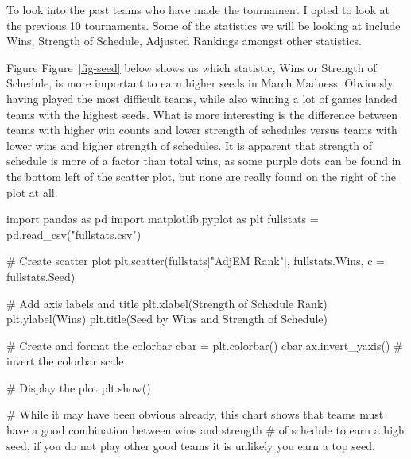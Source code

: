 \documentclass[
  letterpaper,
  DIV=11,
  numbers=noendperiod]{scrartcl}
\newenvironment{Shaded}{\begin{snugshade}}{\end{snugshade}}
\newcommand{\CommentTok}[1]{\textcolor[rgb]{0.37,0.37,0.37}{#1}}
\newcommand{\ImportTok}[1]{\textcolor[rgb]{0.00,0.46,0.62}{#1}}
\newcommand{\NormalTok}[1]{\textcolor[rgb]{0.00,0.23,0.31}{#1}}
\newcommand{\OperatorTok}[1]{\textcolor[rgb]{0.37,0.37,0.37}{#1}}
\newcommand{\StringTok}[1]{\textcolor[rgb]{0.13,0.47,0.30}{#1}}
\begin{document}
To look into the past teams who have made the tournament I opted to look
at the previous 10 tournaments. Some of the statistics we will be
looking at include Wins, Strength of Schedule, Adjusted Rankings amongst
other statistics.

Figure Figure~\ref{fig-seed} below shows us which statistic, Wins or
Strength of Schedule, is more important to earn higher seeds in March
Madness. Obviously, having played the most difficult teams, while also
winning a lot of games landed teams with the highest seeds. What is more
interesting is the difference between teams with higher win counts and
lower strength of schedules versus teams with lower wins and higher
strength of schedules. It is apparent that strength of schedule is more
of a factor than total wins, as some purple dots can be found in the
bottom left of the scatter plot, but none are really found on the right
of the plot at all.

\begin{Shaded}
\begin{Highlighting}[]
\ImportTok{import}\NormalTok{ pandas }\ImportTok{as}\NormalTok{ pd}
\ImportTok{import}\NormalTok{ matplotlib.pyplot }\ImportTok{as}\NormalTok{ plt}
\NormalTok{fullstats }\OperatorTok{=}\NormalTok{ pd.read\_csv(}\StringTok{"fullstats.csv"}\NormalTok{)}

\CommentTok{\# Create scatter plot}
\NormalTok{plt.scatter(fullstats[}\StringTok{"AdjEM Rank"}\NormalTok{], fullstats.Wins, c }\OperatorTok{=}\NormalTok{ fullstats.Seed)}

\CommentTok{\# Add axis labels and title}
\NormalTok{plt.xlabel(}\StringTok{\textquotesingle{}Strength of Schedule Rank\textquotesingle{}}\NormalTok{)}
\NormalTok{plt.ylabel(}\StringTok{\textquotesingle{}Wins\textquotesingle{}}\NormalTok{)}
\NormalTok{plt.title(}\StringTok{\textquotesingle{}Seed by Wins and Strength of Schedule\textquotesingle{}}\NormalTok{)}

\CommentTok{\# Create and format the colorbar}
\NormalTok{cbar }\OperatorTok{=}\NormalTok{ plt.colorbar()}
\NormalTok{cbar.ax.invert\_yaxis()  }\CommentTok{\# invert the colorbar scale}

\CommentTok{\# Display the plot}
\NormalTok{plt.show()}


\CommentTok{\# While it may have been obvious already, this chart shows that teams must have a good combination between wins and strength}
\CommentTok{\# of schedule to earn a high seed, if you do not play other good teams it is unlikely you earn a top seed.}
\end{Highlighting}
\end{Shaded}
\end{document}
